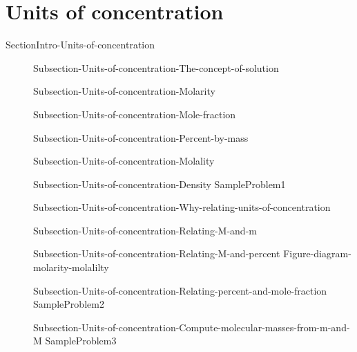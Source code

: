 \documentclass[main.tex]{subfiles}
\newcommand\chapterlabel{Ch-solutions}\setcounter{figurenewcounter}{0}\setcounter{tablenewcounter}{0}\setcounter{formulanewcounter}{0}
\begin{document}
\section{Units of concentration}{SectionIntro-Units-of-concentration}
\sloppy \begin{description}
\item[] 
{Subsection-Units-of-concentration-The-concept-of-solution}
\item[] {Subsection-Units-of-concentration-Molarity}
\item[] {Subsection-Units-of-concentration-Mole-fraction}
\item[] {Subsection-Units-of-concentration-Percent-by-mass}
\item[] {Subsection-Units-of-concentration-Molality}
\item[] {Subsection-Units-of-concentration-Density}
{SampleProblem1}
\item[] {Subsection-Units-of-concentration-Why-relating-units-of-concentration}
\item[] {Subsection-Units-of-concentration-Relating-M-and-m}
\item[] {Subsection-Units-of-concentration-Relating-M-and-percent}
{Figure-diagram-molarity-molalilty}
\item[] 
{Subsection-Units-of-concentration-Relating-percent-and-mole-fraction}
{SampleProblem2}
\item[] 
{Subsection-Units-of-concentration-Compute-molecular-masses-from-m-and-M}
{SampleProblem3}
\end{description}
\end{document}
